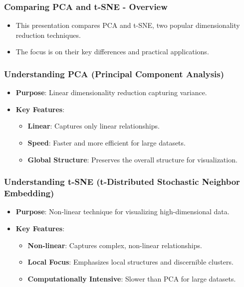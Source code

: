\documentclass[aspectratio=169]{beamer}
\begin{document}
\begin{frame}[fragile]
    \frametitle{Comparing PCA and t-SNE - Overview}
    \begin{itemize}
        \item This presentation compares PCA and t-SNE, two popular dimensionality reduction techniques.
        \item The focus is on their key differences and practical applications.
    \end{itemize}
\end{frame}

\begin{frame}[fragile]
    \frametitle{Understanding PCA (Principal Component Analysis)}
    \begin{itemize}
        \item \textbf{Purpose}: Linear dimensionality reduction capturing variance.
        \item \textbf{Key Features}:
        \begin{itemize}
            \item \textbf{Linear}: Captures only linear relationships.
            \item \textbf{Speed}: Faster and more efficient for large datasets.
            \item \textbf{Global Structure}: Preserves the overall structure for visualization.
        \end{itemize}
    \end{itemize}
\end{frame}

\begin{frame}[fragile]
    \frametitle{Understanding t-SNE (t-Distributed Stochastic Neighbor Embedding)}
    \begin{itemize}
        \item \textbf{Purpose}: Non-linear technique for visualizing high-dimensional data.
        \item \textbf{Key Features}:
        \begin{itemize}
            \item \textbf{Non-linear}: Captures complex, non-linear relationships.
            \item \textbf{Local Focus}: Emphasizes local structures and discernible clusters.
            \item \textbf{Computationally Intensive}: Slower than PCA for large datasets.
        \end{itemize}
    \end{itemize}
\end{frame}
\end{document}
